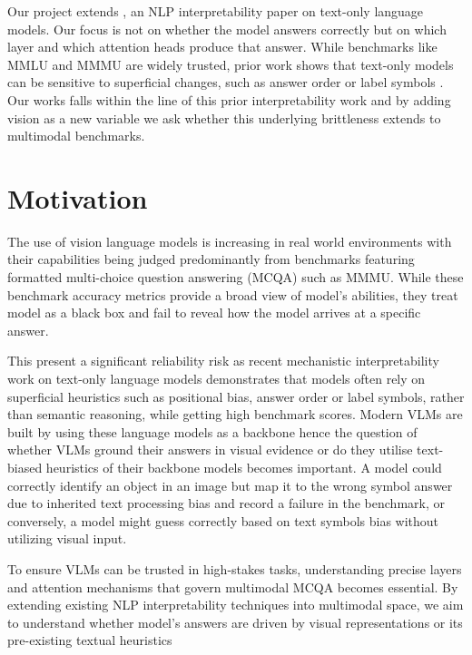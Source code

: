\documentclass[11pt]{article}
\begin{document}
Our project extends \cite{wiegreffe2025answerassembleaceunderstanding}, an NLP interpretability paper on text-only language models. Our focus is not on whether the model answers correctly but on which layer and which attention heads produce that answer. While benchmarks like MMLU and MMMU are widely trusted, prior work shows that text-only models can be sensitive to superficial changes, such as answer order or label symbols \cite{pezeshkpour2024large,alzahrani2024when,khatun2024study,zheng2024large}. Our works falls within the line of this prior interpretability work and by adding vision as a new variable we ask whether this underlying brittleness extends to multimodal benchmarks. 

\section{Motivation}

The use of vision language models is increasing in real world environments with their capabilities being judged predominantly from benchmarks featuring formatted multi-choice question answering (MCQA) such as MMMU. While these benchmark accuracy metrics provide a broad view of model’s abilities, they treat model as a black box and fail to reveal how the model arrives at a specific answer. 

This present a significant reliability risk as recent mechanistic interpretability work on text-only language models demonstrates that models often rely on superficial heuristics such as positional bias, answer order or label symbols, rather than semantic reasoning, while getting high benchmark scores. Modern VLMs are built by using these language models as a backbone hence the question of whether VLMs ground their answers in visual evidence or do they utilise text-biased heuristics of their backbone models becomes important. A model could correctly identify an object in an image but map it to the wrong symbol answer due to inherited text processing bias and record a failure in the benchmark, or conversely, a model might guess correctly based on text symbols bias without utilizing visual input.

To ensure VLMs can be trusted in high-stakes tasks, understanding precise layers and attention mechanisms that govern multimodal MCQA becomes essential. By extending existing NLP interpretability techniques into multimodal space, we aim to understand whether model’s answers are driven by visual representations or its pre-existing textual heuristics
\end{document}
